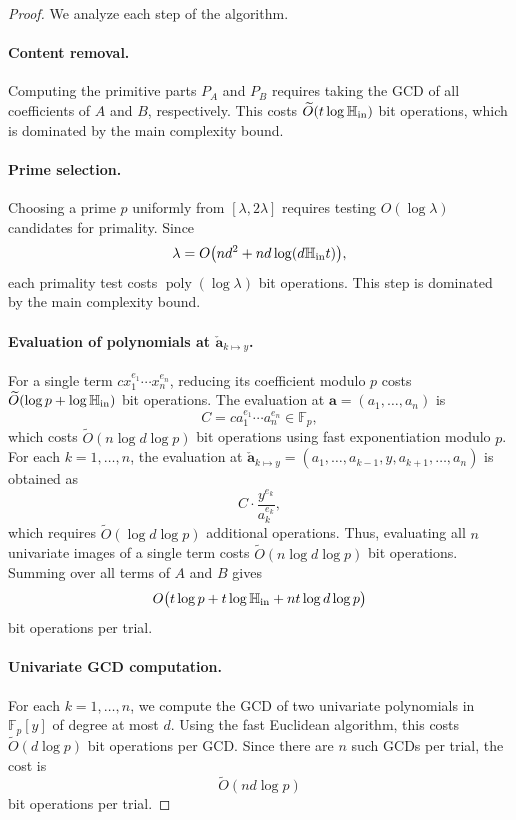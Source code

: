 \documentclass{article}
\numberwithin{equation}{section}
\begin{document}
\begin{proof}
We analyze each step of the algorithm.

\paragraph{Content removal.}
Computing the primitive parts $P_A$ and $P_B$ requires taking the GCD of all coefficients of $A$ and $B$, respectively. This costs $\widetilde{O}(t \log \mathbb{H}_{\rm in})$ bit operations, which is dominated by the main complexity bound.

\paragraph{Prime selection.}
Choosing a prime $p$ uniformly from $[\lambda, 2\lambda]$ requires testing $O(\log \lambda)$ candidates for primality. Since
\[
\lambda = O\bigl(nd^2 + nd\log(d\mathbb{H}_{\rm in} t)\bigr),
\]
each primality test costs $\operatorname{poly}(\log \lambda)$ bit operations. This step is dominated by the main complexity bound.

\paragraph{Evaluation of polynomials at $\mathbf{\check{a}}_{k \mapsto y} $.}
For a single term $c x_1^{e_1}\cdots x_n^{e_n}$, reducing its coefficient modulo $p$ costs $\widetilde{O}(\log p + \log \mathbb{H}_{\rm in})$ bit operations. The evaluation at $\mathbf{a} = (a_1,\dots,a_n)$ is
\[
C = c a_1^{e_1}\cdots a_n^{e_n} \in \mathbb{F}_p,
\]
which costs $\widetilde{O}(n \log d \log p)$ bit operations using fast exponentiation modulo $p$. For each $k=1,\dots,n$, the evaluation at $\mathbf{\check{a}}_{k \mapsto y}  = (a_1,\dots,a_{k-1}, y, a_{k+1},\dots,a_n)$ is obtained as
\[
C \cdot \frac{y^{e_k}}{a_k^{e_k}},
\]
which requires $\widetilde{O}(\log d \log p)$ additional operations. Thus, evaluating all $n$ univariate images of a single term costs $\widetilde{O}(n \log d \log p)$ bit operations. Summing over all terms of $A$ and $B$ gives
\[
O\bigl( t\log p + t\log \mathbb{H}_{\rm in} + n t \log d \log p \bigr)
\]
bit operations per trial.

\paragraph{Univariate GCD computation.}
For each $k=1,\dots,n$, we compute the GCD of two univariate polynomials in $\mathbb{F}_p[y]$ of degree at most $d$. Using the fast Euclidean algorithm, this costs $\widetilde{O}(d \log p)$ bit operations per GCD. Since there are $n$ such GCDs per trial, the cost is
\[
\widetilde{O}(n d \log p)
\]
bit operations per trial.


\end{proof}
\end{document}
